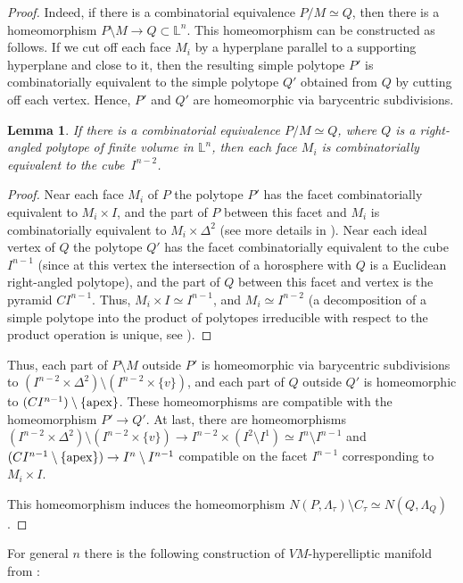 \documentclass[12pt]{amsart}
\newtheorem{lemma}[formula]{Lemma}
\theoremstyle{definition}
\theoremstyle{remark}
\begin{document}
\begin{proof}
Indeed, if there is a combinatorial equivalence $P/M\simeq Q$, then there is a homeomorphism
$P\setminus M\to Q\subset \mathbb L^n$. This homeomorphism can be constructed as follows.
If we cut off each face $M_i$ by a hyperplane parallel to a supporting hyperplane and close to it, 
then the resulting simple polytope $P'$ 
is combinatorially equivalent to the simple polytope $Q'$ obtained from $Q$ by cutting off each vertex.
Hence, $P'$ and $Q'$ are homeomorphic via barycentric subdivisions.
\begin{lemma}
If there is a combinatorial equivalence $P/M\simeq  Q$, where $Q$ is a right-angled polytope 
of finite volume in $\mathbb L^n$, then each face $M_i$ is combinatorially equivalent to the cube~$I^{n-2}$.
\end{lemma}
\begin{proof} 
Near each face $M_i$ of $P$
the polytope $P'$ has the facet combinatorially equivalent to $M_i\times I$, and the part of $P$ between this facet
and $M_i$ is combinatorially equivalent to $M_i\times \Delta^2$ (see more details in \cite[Construction 4.32]{E26}).
Near each ideal vertex of $Q$ the polytope $Q'$ has the facet combinatorially equivalent to the cube $I^{n-1}$ 
(since at this vertex the intersection of a horosphere with $Q$ is a Euclidean right-angled polytope),
and the part of $Q$ between this facet and vertex is the pyramid $CI^{n-1}$. Thus, $M_i\times I\simeq I^{n-1}$, and
$M_i\simeq I^{n-2}$ (a decomposition of a simple polytope into the product of polytopes irreducible
with respect to the product operation is unique, see \cite[Proposition A.1]{BE11}).
\end{proof} 
Thus, each part of $P\setminus M$ outside $P'$ is homeomorphic via barycentric subdivisions to 
$(I^{n-2}\times \Delta^2)\setminus (I^{n-2}\times \{v\})$, 
and each part of $Q$ outside $Q'$ is homeomorphic to $(CI^{n-1})\setminus\{{\rm apex}\}$. These homeomorphisms are
compatible with the homeomorphism $P'\to Q'$. At last, there are homeomorphisms 
$(I^{n-2}\times \Delta^2)\setminus (I^{n-2}\times \{v\})\to I^{n-2}\times (I^2\setminus I^1)\simeq I^n\setminus I^{n-1}$ and 
$(CI^{n-1}\setminus\{{\rm apex}\})\to I^n\setminus I^{n-1}$ compatible on the facet $I^{n-1}$
corresponding to $M_i\times I$.

This homeomorphism induces the homeomorphism $N(P,\Lambda_\tau)\setminus C_\tau\simeq N(Q,\Lambda_Q)$. 
\end{proof}

For general $n$ there is the following construction of $VM$-hyperelliptic manifold from \cite{E26}: 
\end{document}

